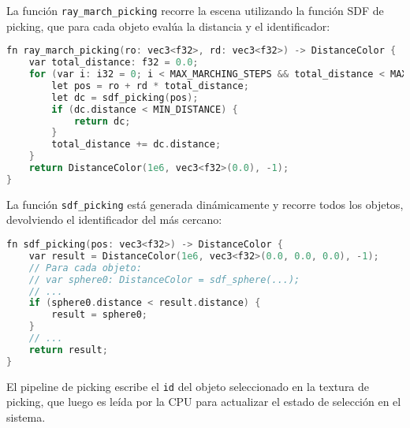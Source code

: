 La función \texttt{ray\_march\_picking} recorre la escena utilizando la función
SDF de picking, que para cada objeto evalúa la distancia y el identificador:

\begin{lstlisting}[language=C++, caption={Ray marching picking loop}]
fn ray_march_picking(ro: vec3<f32>, rd: vec3<f32>) -> DistanceColor {
    var total_distance: f32 = 0.0;
    for (var i: i32 = 0; i < MAX_MARCHING_STEPS && total_distance < MAX_DISTANCE; i++) {
        let pos = ro + rd * total_distance;
        let dc = sdf_picking(pos);
        if (dc.distance < MIN_DISTANCE) {
            return dc;
        }
        total_distance += dc.distance;
    }
    return DistanceColor(1e6, vec3<f32>(0.0), -1);
}
\end{lstlisting}

La función \texttt{sdf\_picking} está generada dinámicamente y recorre todos
los objetos, devolviendo el identificador del más cercano:

\begin{lstlisting}[language=C++, caption={SDF picking para todos los objetos}]
fn sdf_picking(pos: vec3<f32>) -> DistanceColor {
    var result = DistanceColor(1e6, vec3<f32>(0.0, 0.0, 0.0), -1);
    // Para cada objeto:
    // var sphere0: DistanceColor = sdf_sphere(...);
    // ...
    if (sphere0.distance < result.distance) {
        result = sphere0;
    }
    // ...
    return result;
}
\end{lstlisting}

El pipeline de picking escribe el \texttt{id} del objeto seleccionado en la
textura de picking, que luego es leída por la CPU para actualizar el estado de
selección en el sistema.
